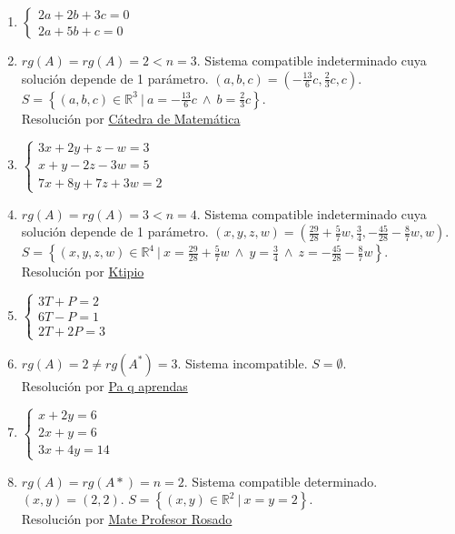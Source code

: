 \documentclass[a4paper]{article}
\newcommand{\answer}{\item[**]}
\begin{document}
\begin{enumerate}
\begin{multicols}{2}
\begin{enumerate} [label=(\alph*)]
		\item $\left\{\begin{matrix} 2a+2b+3c=0 \\ 2a+5b+c=0 \end{matrix}\right.$
		\answer $rg(A)=rg(A)=2<n=3$. Sistema compatible indeterminado cuya solución depende de 1 parámetro. $(a,b,c)=\left(-\frac{13}{6}c,\frac{2}{3}c,c\right)$. \\ $S=\left\{(a,b,c)\in \mathbb{R}^3 ~|~ a=-\frac{13}{6}c ~\land~ b=\frac{2}{3}c \right\}$. \\ Resolución por \href{https://youtu.be/etAvBSvqpB0}{Cátedra de Matemática}

		\item $\left\{\begin{matrix} 3x+2y+z-w=3 \\ x+y-2z-3w=5 \\ 7x+8y +7z +3w=2 \end{matrix}\right.$
		\answer $rg(A)=rg(A)=3<n=4$. Sistema compatible indeterminado cuya solución depende de 1 parámetro. $(x,y,z,w)=\left( \frac{29}{28}+\frac{5}{7}w,\frac{3}{4},-\frac{45}{28}-\frac{8}{7}w,w \right)$. \\ $S=\left\{(x,y,z,w) \in \mathbb{R}^4 ~|~ x=\frac{29}{28}+\frac{5}{7}w ~\land~ y=\frac{3}{4} ~\land~ z=-\frac{45}{28}-\frac{8}{7}w \right\}$. \\ Resolución por \href{https://youtu.be/OE8e70VO_CE}{Ktipio}

		\item $\left\{\begin{matrix} 3T+P=2 \\ 6T-P=1 \\ 2T+2P=3 \end{matrix}\right.$
		\answer $rg(A)=2 \neq rg(A^*)=3$. Sistema incompatible. $S=\emptyset$. \\ Resolución por \href{https://youtu.be/u-F-3jxqf_s}{Pa q aprendas}

		\item $\left\{\begin{matrix} x+2y=6 \\ 2x+y=6 \\ 3x+4y=14 \end{matrix}\right.$
		\answer $rg(A)=rg(A*)=n=2$. Sistema compatible determinado. \\ $(x,y)=(2,2)$. $S=\left\{(x,y)\in \mathbb{R}^2 ~|~ x=y=2 \right\}$. \\ Resolución por \href{https://youtu.be/qTj1yLgl1F4?t=131}{Mate Profesor Rosado}


\end{enumerate}
\end{multicols}
\end{enumerate}
\end{document}

